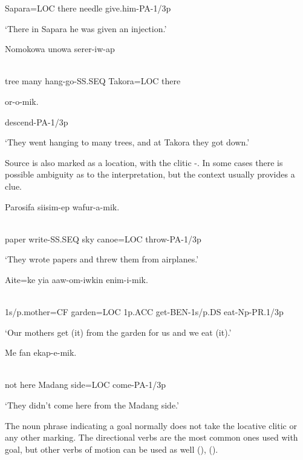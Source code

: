 Sapara=LOC  there  needle  give.him-PA-1/3p

`There in Sapara he was given an injection.'

\ea%
\label{ex:x865}
\gll Nomokowa  unowa  serer-iw-ap   \\
      \\
\glt
\z

tree  many  hang-go-SS.SEQ  Takora=LOC  there  

or-o-mik.

descend-PA-1/3p

`They went hanging to many trees, and at Takora they got down.'

Source is also marked as a location, with the clitic -. In some cases there is possible ambiguity as to the interpretation, but the context usually provides a clue.

\ea%
\label{ex:x858}
\gll Parosifa  siisim-ep    wafur-a-mik. \\
      \\
\glt
\z

paper  write-SS.SEQ  sky  canoe=LOC  throw-PA-1/3p

`They wrote papers and threw them from airplanes.'

\ea%
\label{ex:x859}
\gll Aite=ke    yia  aaw-om-iwkin  enim-i-mik. \\
      \\
\glt
\z

1s/p.mother=CF  garden=LOC  1p.ACC  get-BEN-1s/p.DS  eat-Np-PR.1/3p

`Our mothers get (it) from the garden for us and we eat (it).'

\ea%
\label{ex:x864}
\gll Me  fan    ekap-e-mik. \\
      \\
\glt
\z

not  here  Madang  side=LOC  come-PA-1/3p

`They didn't come here from the Madang side.'

The noun phrase indicating a goal normally does not take the locative clitic or any other marking.  The directional verbs are the most common ones used with goal, but other verbs of motion can be used as well (), (). 

